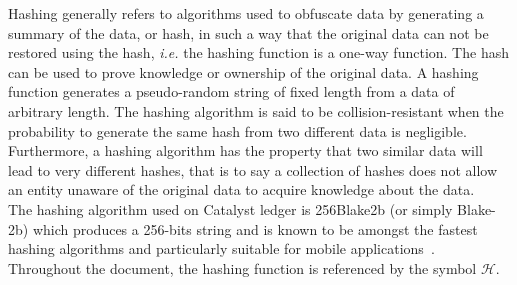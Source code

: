 Hashing generally refers to algorithms used to obfuscate data by generating a summary of the data, or hash, in such a way that the original data can not be restored using the hash, \textit{i.e.} the hashing function is a one-way function. The hash can be used to prove knowledge or ownership of the original data. A hashing function generates a pseudo-random string of fixed length from a data of arbitrary length. The hashing algorithm is said to be collision-resistant when the probability to generate the same hash from two different data is negligible. Furthermore, a hashing algorithm has the property that two similar data will lead to very different hashes, that is to say a collection of hashes does not allow an entity unaware of the original data to acquire knowledge about the data. \\ 

The hashing algorithm used on Catalyst ledger is 256Blake2b (or simply Blake-2b) which produces a 256-bits string and is known to be amongst the fastest hashing algorithms and particularly suitable for mobile applications~\cite{blake}. Throughout the document, the hashing function is referenced by the symbol $\mathcal{H}$.

